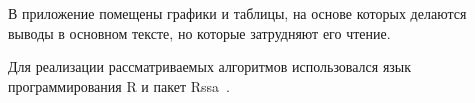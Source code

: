 \documentclass[specialist,
substylefile = spbu_report.rtx,
subf,href,colorlinks=true, 12pt]{disser}
\theoremstyle{definition}
\begin{document}
 
В приложение помещены графики и таблицы, на основе которых делаются выводы в основном тексте, но которые затрудняют его чтение.

Для реализации рассматриваемых алгоритмов использовался язык программирования \textsf{R} и пакет \textsf{Rssa}~\cite{Rssa}.



\end{document}
